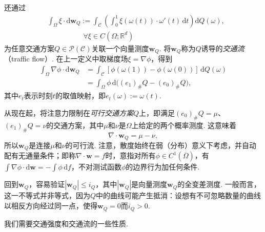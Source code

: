 还通过
\begin{equation*}
\begin{aligned}
 &\int_\Omega\xi\cdot\mathrm d\mathbf w_Q
 :=\int_{\mathscr C}\left(\int_0^1\xi(\omega(t))\cdot\omega'(t)\,\mathrm dt\right)\mathrm dQ(\omega),\\
 &\hspace{5em}\forall\xi\in C(\Omega;\mathbb R^d)
\end{aligned}
\end{equation*}
为任意交通方案$Q\in\mathscr P(\mathscr C)$关联一个向量测度$\mathbf w_Q$. 将$\mathbf w_Q$称为$Q$诱导的\emph{交通流}（traffic flow）. 在上一定义中取梯度场$\xi=\nabla\phi$，得到
\begin{equation*}
\begin{aligned}
 \int_\Omega\nabla\phi\cdot\mathrm d\mathbf w_Q
 &=\int_{\mathscr C}[\phi(\omega(1))-\phi(\omega(0))]\,\mathrm dQ(\omega)\\
 &=\int_\Omega\phi\,\mathrm d\bigl((e_1)_\#Q-(e_0)_\#Q\bigr),
\end{aligned}
\end{equation*}
其中$e_t$表示时刻$t$的取值映射，即$e_t(\omega):=\omega(t)$.

从现在起，将注意力限制在\emph{可行交通方案}$Q$上，即满足$(e_0)_\#Q=\mu$、$(e_1)_\#Q=\nu$的交通方案，其中$\mu$和$\nu$是$\Omega$上给定的两个概率测度. 这意味着
\[
 \nabla\cdot\mathbf w_Q=\mu-\nu,
\]
所以$\mathbf w_Q$是连接$\mu$和$\nu$的可行流. 注意，散度始终在弱（分布）意义下考虑，并自动配有无通量条件；即称$\nabla\cdot\mathbf w=f$时，意指对所有$\phi\in C^1(\overline\Omega)$，有$\int\nabla\phi\cdot\mathrm d\mathbf w=-\int\phi\,\mathrm df$，不对测试函数$\phi$的边界行为加任何条件.

回到$\mathbf w_Q$，容易验证$|\mathbf w_Q|\leq i_Q$，其中$|\mathbf w_Q|$是向量测度$\mathbf w_Q$的全变差测度. 一般而言，这一不等式并非等式，因为$Q$中的曲线可能产生抵消：设想有不可忽略数量的曲线以相反方向经过同一点，使得$\mathbf w_Q=0$而$i_Q>0$.

我们需要交通强度和交通流的一些性质.


